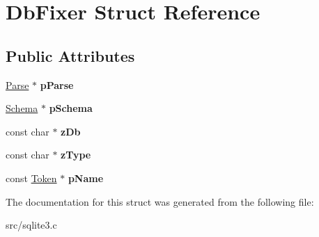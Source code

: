 \hypertarget{struct_db_fixer}{\section{Db\-Fixer Struct Reference}
\label{struct_db_fixer}
}
\subsection*{Public Attributes}
\begin{DoxyCompactItemize}
\item 
\hypertarget{struct_db_fixer_ac5c9b8bca3b05a66faea11dd998bf6f6}{\hyperlink{struct_parse}{Parse} $\ast$ {\bfseries p\-Parse}}\label{struct_db_fixer_ac5c9b8bca3b05a66faea11dd998bf6f6}

\item 
\hypertarget{struct_db_fixer_a302dd5335c8a982deda5bf04bae00363}{\hyperlink{struct_schema}{Schema} $\ast$ {\bfseries p\-Schema}}\label{struct_db_fixer_a302dd5335c8a982deda5bf04bae00363}

\item 
\hypertarget{struct_db_fixer_aba91df5965a99915d9180805d02c4a7f}{const char $\ast$ {\bfseries z\-Db}}\label{struct_db_fixer_aba91df5965a99915d9180805d02c4a7f}

\item 
\hypertarget{struct_db_fixer_ae4748d9e97560b7b332527434408c2e8}{const char $\ast$ {\bfseries z\-Type}}\label{struct_db_fixer_ae4748d9e97560b7b332527434408c2e8}

\item 
\hypertarget{struct_db_fixer_aedee20e10de7337651b84656ee81b39c}{const \hyperlink{struct_token}{Token} $\ast$ {\bfseries p\-Name}}\label{struct_db_fixer_aedee20e10de7337651b84656ee81b39c}

\end{DoxyCompactItemize}


The documentation for this struct was generated from the following file\-:\begin{DoxyCompactItemize}
\item 
src/sqlite3.\-c\end{DoxyCompactItemize}
